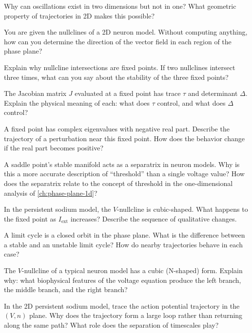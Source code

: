 \begin{conceptquestions}
  \item Why can oscillations exist in two dimensions but not in one? What geometric property of trajectories in 2D makes this possible?

  \item You are given the nullclines of a 2D neuron model. Without computing anything, how can you determine the direction of the vector field in each region of the phase plane?

  \item Explain why nullcline intersections are fixed points. If two nullclines intersect three times, what can you say about the stability of the three fixed points?

  \item The Jacobian matrix $J$ evaluated at a fixed point has trace $\tau$ and determinant $\Delta$. Explain the physical meaning of each: what does $\tau$ control, and what does $\Delta$ control?

  \item A fixed point has complex eigenvalues with negative real part. Describe the trajectory of a perturbation near this fixed point. How does the behavior change if the real part becomes positive?

  \item A saddle point's stable manifold acts as a separatrix in neuron models. Why is this a more accurate description of ``threshold'' than a single voltage value? How does the separatrix relate to the concept of threshold in the one-dimensional analysis of \cref{ch:phase-plane-1d}?

  \item In the persistent sodium model, the $V$-nullcline is cubic-shaped. What happens to the fixed point as $I_{\text{ext}}$ increases? Describe the sequence of qualitative changes.

  \item A limit cycle is a closed orbit in the phase plane. What is the difference between a stable and an unstable limit cycle? How do nearby trajectories behave in each case?

  \item The $V$-nullcline of a typical neuron model has a cubic (N-shaped) form. Explain why: what biophysical features of the voltage equation produce the left branch, the middle branch, and the right branch?

  \item In the 2D persistent sodium model, trace the action potential trajectory in the $(V, n)$ plane. Why does the trajectory form a large loop rather than returning along the same path? What role does the separation of timescales play?


\end{conceptquestions}

